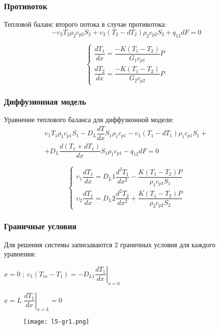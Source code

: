 \begin{frame}
	\frametitle{Противоток}
	Тепловой баланс второго потока в случае противотока:
	\begin{equation}
	-\upsilon_2 T_2 \rho_2 c_{p2} S_2 + \upsilon_2 (T_2-d T_2) \rho_2 c_{p2} S_2 +q_{12} dF =0
	\end{equation}
	
	\begin{equation}
	\left\lbrace 
	\begin{gathered} 
	\dfrac {dT_1} {dx} = \dfrac {-K (T_1-T_2)} {G_1 c_{p1}} P \\
	\dfrac {dT_2} {dx} = \dfrac {-K (T_1-T_2)} {G_2 c_{p2}} P
	\end{gathered} 
	\right.
	\end{equation}
	
\end{frame}

\begin{frame}
\frametitle{Диффузионная модель}
Уравнение теплового баланса для диффузионной модели:
	\begin{multline}
	\upsilon_1 T_1 \rho_1 c_{p1} S_1 -D_L \dfrac {dT} {dx} S_1 \rho_1 c_{p1} - \upsilon_1 (T_1-dT_1) \rho_1 c_{p1} S_1 + \\   +D_L \dfrac {d(T_1+dT_1)} {dx} S_1 \rho_1 c_{p1}-q_{12} dF =0
	\end{multline}

\begin{equation}
\left\lbrace 
\begin{gathered} 
\upsilon_1 \dfrac {dT_1} {dx} = D_L1 \dfrac {d^2 T_1} {dx^2} - \dfrac {K(T_1-T_2) P} {\rho_1 c_{p1} S_1} \\
\upsilon_2 \dfrac {dT_1} {dx} = D_L2 \dfrac {d^2 T_2} {dx^2} + \dfrac {K(T_1-T_2) P} {\rho_2 c_{p2} S_2} 
\end{gathered} 
\right.
\end{equation}

\end{frame}

\begin{frame}
	\frametitle{Граничные условия}
Для решения системы записываются 2 граничных условия для каждого уравнения:
 
$x=0$ ; \quad $\upsilon_1 ( T_{in} - T_1 ) = -D_{L1} \left.  \dfrac { d T_1 } { dx }  \right| _{ x=0 }$

$x=L$ \quad $ \left. \dfrac { d T_1 } { dx }  \right|_{ x=L } =0$


\begin{figure}[h]
	\texttt{[image: l5-gr1.png]}
\end{figure}
\end{frame}

